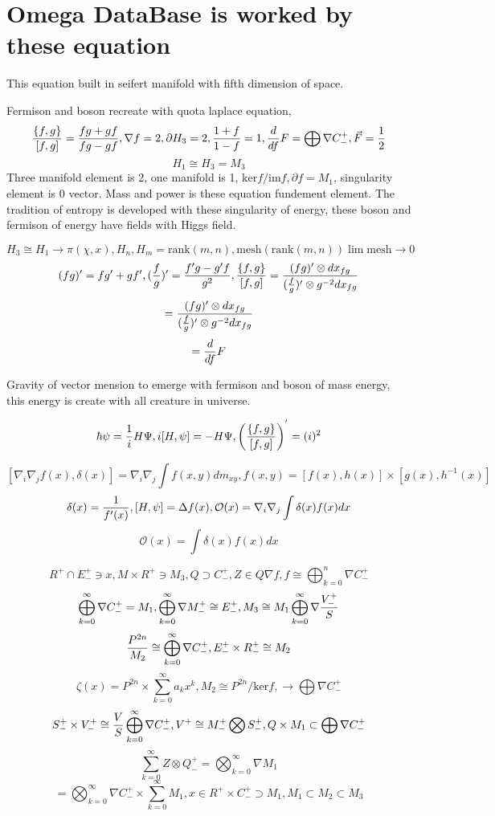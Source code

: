 \documentclass{jsarticle}
\begin{document}
  \section{Omega DataBase is worked by these equation}
  This equation built in seifert manifold with fifth dimension of space.

  Fermison and boson recreate with quota laplace equation,
  $$ {\{f,g\} \over [f,g]} = {fg + gf \over fg - gf}, 
  \nabla f = 2, \partial H_3 = 2, {1 + f \over 1 - f} = 1, {d \over df} F = \bigoplus \nabla C^{+}_{-}, \vec{F} =
  {1 \over 2} $$
  $$ H_1 \cong H_3 = M_3 $$
  Three manifold element is 2, one manifold is 1, $ \mathrm{ker} f / \mathrm{im} f, \partial f = M_1 $,
  singularity element is 0 vector.
  Mass and power is these equation fundement element.
  The tradition of entropy is developed with these singularity of energy, these boson and fermison of energy have fields with Higgs 
field.

$$ H_3 \cong H_1 \to \pi(\chi,x), H_n, H_m = \mathrm{rank}(m,n), \mathrm{mesh}(\mathrm{rank}(m,n)) \lim \mathrm{mesh} \to 0 $$
$$ (fg)' = fg' + gf', ({f \over g})' = {{f'g - g'f} \over g^2}, {\{f,g\} \over [f,g]} = {(fg)' \otimes dx_{fg} \over 
({f \over g})' \otimes g^{-2}dx_{fg}} $$
$$ = {{(fg)'\otimes dx_{fg}} \over ({f \over g})' \otimes g^{-2}dx_{fg}} $$
$$ = {d \over df} F $$

  Gravity of vector mension to emerge with fermison and boson of mass energy,
  this energy is create with all creature in universe.

  $$ \hbar\psi = {1 \over i} H \Psi, i[H,\psi] = - H \Psi, \left({\{f,g\} \over [f,g]}\right)^{'} = (i)^2 $$

  $$ [\nabla_{i} \nabla_{j} f(x), \delta(x)] = \nabla_{i} \nabla_{j} \int f(x,y)dm_{xy}, f(x,y) = [f(x), h(x)] \times [g(x), h^{-1}(x)] $$
  $$ \delta(x) = {1 \over f'(x)}, [H, \psi] = \Delta f(x), \mathcal{O}(x) = \nabla_{i} \nabla_{j} \int \delta(x)f(x)dx $$
  $$ \mathcal{O}(x) = \int \delta(x)f(x)dx $$

  $$ R^{+} \cap E^{+}_{-} \ni x, M \times R^{+} \ni M_3, Q \supset C^{+}_{-}, Z \in Q \nabla f, f \cong \bigoplus_{k=0}^{n} \nabla C^{+}_{-} $$
  $$ \bigoplus_{k=0}^{\infty} \nabla C^{+}_{-} = M_1, \bigoplus_{k=0}^{\infty} \nabla M^{+}_{-} \cong E^{+}_{-},
  M_3 \cong M_1 \bigoplus_{k=0}^{\infty} \nabla {V^{+}_{-} \over S} $$
  $$ {P^{2n} \over M_2} \cong \bigoplus_{k=0}^{\infty} \nabla C^{+}_{-}, E^{+}_{-} \times R^{+}_{-} \cong M_2 $$
  $$ \zeta(x) = P^{2n} \times \sum_{k=0}^{\infty} a_k x^k, M_2 \cong P^{2n}/\mathrm{ker}f, \to \bigoplus \nabla C^{+}_{-} $$
  $$ S^{+}_{-} \times V^{+}_{-} \cong {V \over S} \bigoplus_{k=0}^{\infty} \nabla C^{+}_{-}, V^{+} \cong M^{+}_{-} \bigotimes S^{+}_{-}, Q \times M_1 \subset \bigoplus \nabla C^{+}_{-}  $$
  $$ \sum_{k=0}^{\infty} Z \otimes Q^{+}_{-} = \bigotimes_{k=0}^{\infty} \nabla M_1 $$
  $$ = \bigotimes_{k=0}^{\infty} \nabla C^{+}_{-} \times \sum_{k=0}^{\infty} M_1, x \in R^{+} \times C^{+}_{-}
  \supset M_1, M_1 \subset M_2 \subset M_3 $$
\end{document}

